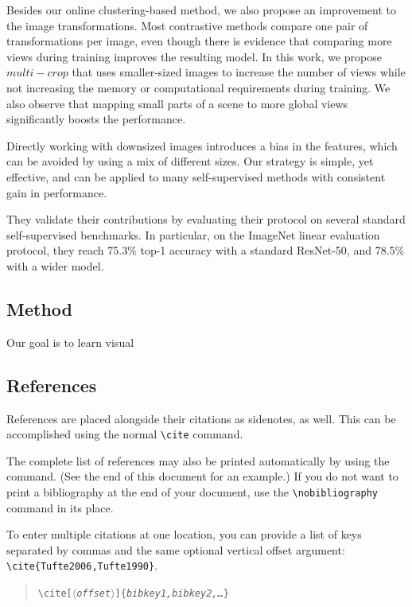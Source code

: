 \documentclass{tufte-handout}
\newcommand{\doccmd}[1]{\texttt{\textbackslash#1}}%
\newcommand{\docopt}[1]{\ensuremath{\langle}\textrm{\textit{#1}}\ensuremath{\rangle}}%
\newcommand{\docarg}[1]{\textrm{\textit{#1}}}%
\newenvironment{docspec}{\begin{quote}\noindent}{\end{quote}}%
\begin{document}
Besides our online clustering-based method, we also propose an improvement to the image transformations.
Most contrastive methods compare one pair of transformations per image, even though there is evidence that comparing more views during training improves the resulting model.
In this work, we propose $multi-crop$ that uses smaller-sized images to increase the number of views while not increasing the memory or computational requirements during training.
We also observe that mapping small parts of a scene to more global views significantly boosts the performance.

Directly working with downsized images introduces a bias in the features, which can be avoided by using a mix of different sizes.
Our strategy is simple, yet effective, and can be applied to many self-supervised methods with consistent gain in performance.

They validate their contributions by evaluating their protocol on several standard self-supervised benchmarks.
In particular, on the ImageNet linear evaluation protocol, they reach 75.3\% top-1 accuracy with a standard ResNet-50, and 78.5\% with a wider model. 
\subsection{Method}\label{sec:method}
Our goal is to learn visual 

\subsection{References}
References are placed alongside their citations as sidenotes,
as well.  This can be accomplished using the normal \Verb|\cite|
command.

The complete list of references may also be printed automatically by using
the \Verb|| command.  (See the end of this document for an
example.)  If you do not want to print a bibliography at the end of your
document, use the \Verb|\nobibliography| command in its place.  

To enter multiple citations at one location,\cite{Tufte2006,Tufte1990} you can
provide a list of keys separated by commas and the same optional vertical
offset argument: \Verb|\cite{Tufte2006,Tufte1990}|.  
\begin{docspec}
  \doccmd{cite[\docopt{offset}]\{\docarg{bibkey1,bibkey2,\ldots}\}}
\end{docspec}
\end{document}
